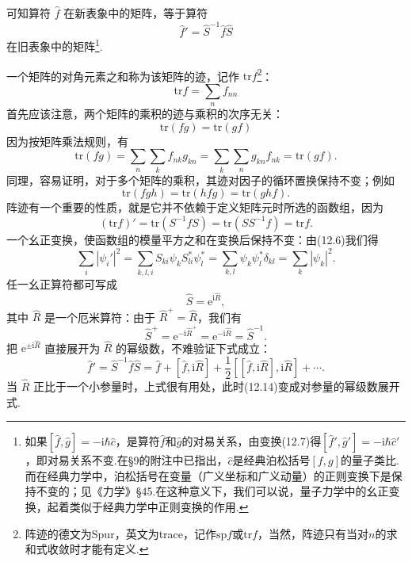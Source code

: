 可知算符 $\hat{f}$ 在新表象中的矩阵，等于算符
\begin{equation}
  \hat{f}'=\hat{S}^{-1}\hat{f}\hat{S}
\end{equation}
在旧表象中的矩阵\footnote{如果$[\hat{f},\hat{g}]=-\mathrm{i}\hbar\hat{c}$，是算符$\hat{f}$和$\hat{g}$的对易关系，由变换(12.7)得$[\hat{f}',\hat{g}']=-\mathrm{i}\hbar\hat{c}'$，即对易关系不变.在§9的附注中已指出，$\hat{c}$是经典泊松括号$[f,g]$的量子类比.而在经典力学中，泊松括号在变量（广义坐标和广义动量）的正则变换下是保持不变的；见《力学》§45.在这种意义下，我们可以说，量子力学中的幺正变换，起着类似于经典力学中正则变换的作用.}.

一个矩阵的对角元素之和称为该矩阵的迹，记作 $\mathrm{tr}f$\footnote{阵迹的德文为Spur，英文为trace，记作$\mathrm{sp}f$或$\mathrm{tr}f$，当然，阵迹只有当对$n$的求和式收敛时才能有定义.}：
\begin{equation}
  \mathrm{tr}f=\sum_nf_{nn}
\end{equation}
首先应该注意，两个矩阵的乘积的迹与乘积的次序无关：
\begin{equation}
  \mathrm{tr}(fg)=\mathrm{tr}(gf)
\end{equation}
因为按矩阵乘法规则，有
\begin{equation*}
  \mathrm{tr}(fg)=\sum_n\sum_kf_{nk}g_{kn}
  =\sum_k\sum_ng_{kn}f_{nk}=\mathrm{tr}(gf).
\end{equation*}
同理，容易证明，对于多个矩阵的乘积，其迹对因子的循环置换保持不变；例如
\begin{equation}
  \mathrm{tr}(fgh)=\mathrm{tr}(hfg)=\mathrm{tr}(ghf).
\end{equation}
阵迹有一个重要的性质，就是它并不依赖于定义矩阵元时所选的函数组，因为
\begin{equation}
  (\mathrm{tr}f)'=\mathrm{tr}(S^{-1}fS)
  =\mathrm{tr}(SS^{-1}f)=\mathrm{tr}f.
\end{equation}
一个幺正变换，使函数组的模量平方之和在变换后保持不变：由(12.6)我们得
\begin{equation}
  \sum_i|\psi_i'|^{2}
  =\sum_{k,l,i}S_{ki}\psi_kS_{li}^{*}\psi_l^{*}
  =\sum_{k,l}\psi_k\psi_l^{*}\delta_{kl}
  =\sum_k|\psi_k|^{2}.
\end{equation}
任一幺正算符都可写成
\begin{equation}
  \hat{S}=\mathrm{e}^{\mathrm{i}\hat{R}},
\end{equation}
其中 $\hat{R}$ 是一个厄米算符：由于 $\hat{R}^{+}=\hat{R}$，我们有
\begin{equation*}
  \hat{S}^{+}=\mathrm{e}^{-\mathrm{i}\hat{R}^{+}}
  =\mathrm{e}^{-\mathrm{i}\hat{R}}=\hat{S}^{-1}.
\end{equation*}
把 $\mathrm{e}^{\pm\mathrm{i}\hat{R}}$ 直接展开为 $\hat{R}$ 的幂级数，不难验证下式成立：
\begin{equation}
  \hat{f}'=\hat{S}^{-1}\hat{f}\hat{S}
  =\hat{f}+[\hat{f},\mathrm{i}\hat{R}]
  +\frac{1}{2}[[\hat{f},\mathrm{i}\hat{R}],\mathrm{i}\hat{R}]+\cdots.
\end{equation}
当 $\hat{R}$ 正比于一个小参量时，上式很有用处，此时(12.14)变成对参量的幂级数展开式.

